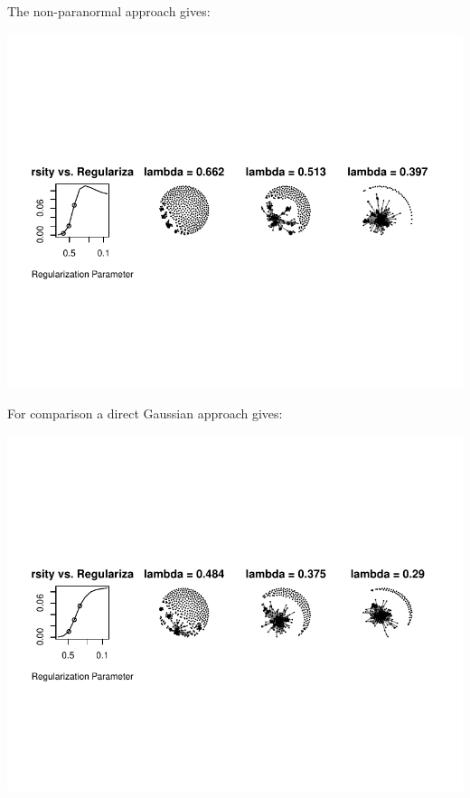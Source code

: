 \documentclass[11pt,handout,aspectratio=169,dvipsnames]{beamer}
\begin{document}
\begin{frame}{}
The non-paranormal approach gives:
\begin{center}
	\includegraphics{pics/huge_stocks1}	
\end{center}
For comparison a direct Gaussian approach gives:
\begin{center}
	\includegraphics{pics/huge_stocks1_gauss}	
\end{center}
\end{frame}
\end{document}
